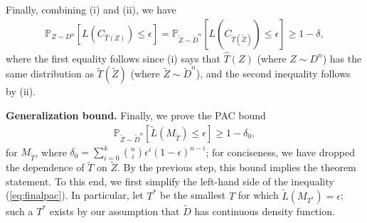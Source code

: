 \documentclass{article} \usepackage{iclr2020_conference,times}
\renewcommand{\(}						{\left(}
\renewcommand{\)}						{\right)}
\renewcommand{\[}						{\left[}
\renewcommand{\]}						{\right]}
\newcommand{\<}						{\left<}
\renewcommand{\>}						{\right>}
\begin{document}
Finally, combining (i) and (ii), we have
\begin{align*}
\mathbb{P}_{Z\sim D^n}[L(C_{\hat T(Z)})\le\epsilon]
= \mathbb{P}_{\tilde Z\sim\tilde D^n}[L(C_{\tilde T(\tilde Z)})\le\epsilon] \ge 1-\delta,
\end{align*}
where the first equality follows since (i) says that $\hat T(Z)$ (where $Z\sim D^n$) has the same distribution as $\tilde T(\tilde Z)$ (where $\tilde Z\sim\tilde D^n$), and the second inequality follows by (ii).

















\textbf{Generalization bound.}
Finally, we prove the PAC bound
\begin{align}
\label{eq:finalpac}
\mathbb{P}_{\tilde Z\sim\tilde D^n}[\tilde{L}(M_{\tilde T})\le\epsilon]\ge1-\delta_0,
\end{align}
for $M_{\tilde T}$, where $\delta_0 = \sum_{i=0}^k{n\choose i}\epsilon^i(1-\epsilon)^{n-i}$; for conciseness, we have dropped the dependence of $\tilde T$ on $\tilde Z$. By the previous step, this bound implies the theorem statement. To this end, we first simplify the left-hand side of the inequality (\ref{eq:finalpac}).
In particular, let $T^*$ be the smallest $T$ for which $\tilde{L}(M_{T^*})=\epsilon$; such a $T^*$ exists by our assumption that $\tilde{D}$ has continuous density function.
\end{document}
